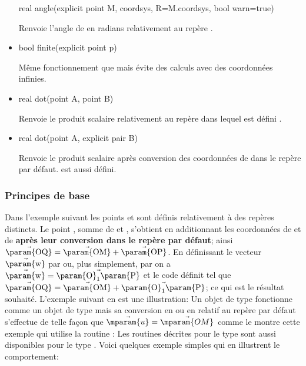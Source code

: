 \documentclass[pdftex]{article}
\begin{document}
\begin{itemize}
  \begin{Vcolor}
    real angle(explicit point M, coordsys,
    R=M.coordsys, bool warn=true)
  \end{Vcolor}
  Renvoie l'angle de  en radians relativement au repère .
\item {}
  \begin{Vcolor}
    bool finite(explicit point p)
  \end{Vcolor}
  Même fonctionnement que  mais évite des calculs
  avec des coordonnées infinies.
\item {}
  \begin{Vcolor}
    real dot(point A, point B)
  \end{Vcolor}
  Renvoie le produit scalaire  relativement au
  repère dans lequel est défini .
\item {}
  \begin{Vcolor}
    real dot(point A, explicit pair B)
  \end{Vcolor}
  Renvoie le produit scalaire  après conversion des
  coordonnées de  dans le repère par défaut.
   est aussi défini.

\end{itemize}

\subsubsection{Principes de base}
Dans l'exemple suivant les points  et  sont définis relativement à
des repères distincts. Le point , somme de  et , s'obtient en
additionnant les coordonnées de  et de  \textbf{après leur conversion dans
  le repère par défaut}; ainsi $\vec{\mbox{\param{OQ}}}=\vec{\mbox{\param{OM}}}+\vec{\mbox{\param{OP}}}$.
En définissant le vecteur $\vec{\mbox{\param{w}}}$ par 
ou, plus simplement, par  on a $\vec{\mbox{\param{w}}}=\vec{\mbox{\param{O}}_{1}\mbox{\param{P}}}$ et le code
 définit  tel
que $\vec{\mbox{\param{OQ}}}=\vec{\mbox{\param{OM}}}+\vec{\mbox{\param{O}}_{1}\mbox{\param{P}}}$; ce qui est le résultat
souhaité. L'exemple suivant en est une illustration:
Un objet  de type  fonctionne comme un objet de type
 mais sa conversion en  ou en  
relatif au repère par défaut s'effectue de telle façon que
$\vec{\mparam{u}}=\vec{\mparam{OM}}$ comme le montre cette exemple qui utilise la
routine :
Les routines décrites pour le type  sont aussi disponibles
pour le type . Voici quelques exemple simples qui en
illustrent le comportement:
\end{document}

